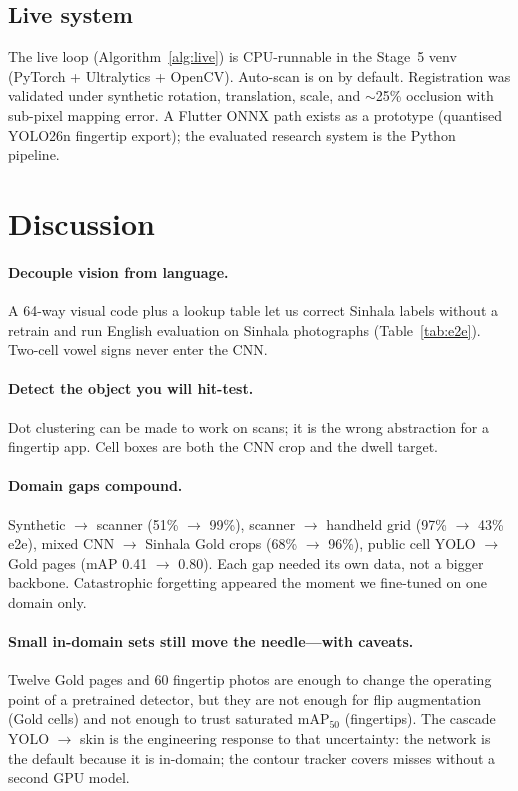 \documentclass[conference]{IEEEtran}
\begin{document}
\subsection{Live system}
The live loop (Algorithm~\ref{alg:live}) is CPU-runnable in the Stage~5
venv (PyTorch + Ultralytics + OpenCV). Auto-scan is on by default.
Registration was validated under synthetic rotation, translation, scale,
and $\sim$25\% occlusion with sub-pixel mapping error. A Flutter ONNX
path exists as a prototype (quantised YOLO26n fingertip export); the
evaluated research system is the Python pipeline.

\section{Discussion}
\label{sec:discuss}

\paragraph{Decouple vision from language.}
A 64-way visual code plus a lookup table let us correct Sinhala labels
without a retrain and run English evaluation on Sinhala photographs
(Table~\ref{tab:e2e}). Two-cell vowel signs never enter the CNN.

\paragraph{Detect the object you will hit-test.}
Dot clustering can be made to work on scans; it is the wrong abstraction
for a fingertip app. Cell boxes are both the CNN crop and the dwell
target.

\paragraph{Domain gaps compound.}
Synthetic $\rightarrow$ scanner (51\% $\rightarrow$ 99\%), scanner
$\rightarrow$ handheld grid (97\% $\rightarrow$ 43\% e2e), mixed CNN
$\rightarrow$ Sinhala Gold crops (68\% $\rightarrow$ 96\%), public cell
YOLO $\rightarrow$ Gold pages (mAP 0.41 $\rightarrow$ 0.80). Each gap
needed its own data, not a bigger backbone. Catastrophic forgetting
appeared the moment we fine-tuned on one domain only.

\paragraph{Small in-domain sets still move the needle---with caveats.}
Twelve Gold pages and 60 fingertip photos are enough to change the
operating point of a pretrained detector, but they are not enough for
flip augmentation (Gold cells) and not enough to trust saturated
mAP$_{50}$ (fingertips). The cascade YOLO $\rightarrow$ skin is the
engineering response to that uncertainty: the network is the default
because it is in-domain; the contour tracker covers misses without a
second GPU model.
\end{document}
